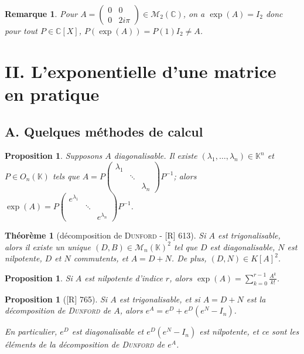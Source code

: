 \documentclass[10pt, a4paper, parskip=full, twoside, twocolumn]{report}
\newtheorem{theorem}[definition]{Théorème}
\newtheorem{proposition}[definition]{Proposition}
\newtheorem{remark}[definition]{Remarque}
\newcommand{\IK}{\mathbb{K}}
\newcommand{\IC}{\mathbb{C}}
\newcommand{\M}{\mathcal{M}}
\begin{document}
\begin{remark}
	Pour $A = \begin{pmatrix}
		0&0\\0& 2i\pi
	\end{pmatrix}\in\M_2(\IC)$, on a $\exp(A) = I_2$ donc pour tout $P\in \IC[X]$, $P(\exp(A)) = P(1)I_2 \neq A$.
\end{remark}

\section*{II. L'exponentielle d'une matrice en pratique}
\subsection*{A. Quelques méthodes de calcul}

\begin{proposition}
	Supposons $A$ diagonalisable. Il existe $(\lambda_1,\dots, \lambda_n)\in\IK^n$ et $P\in O_n(\IK)$ tels que 
	$A = P\begin{pmatrix}
		\lambda_1 & & \\
		& \ddots & \\
		& & \lambda_n
	\end{pmatrix}P^{-1}$; alors $\exp(A) = P\begin{pmatrix}
		e^{\lambda_1} & & \\ & \ddots & \\ & & e^{\lambda_n}
	\end{pmatrix}P^{-1}$.
\end{proposition}

\begin{theorem}[décomposition de \textsc{Dunford} - \textnormal{[R] 613}]
	Si $A$ est trigonalisable, alors il existe un unique $(D,B)\in \M_n(\IK)^2$ tel que $D$ est diagonalisable, $N$ est nilpotente, $D$ et $N$ commutents, et $A = D+N$.
	De plus, $(D,N)\in K[A]^2$.
\end{theorem}

\begin{proposition}
	Si $A$ est nilpotente d'indice $r$, alors $\exp(A) = \sum_{k=0}^{r-1} \frac{A^k}{k!}$.
\end{proposition}

\begin{proposition}[\textnormal{[R] 765}]
	Si $A$ est trigonalisable, et si $A=D+N$ est la décomposition de \textsc{Dunford} de $A$,
	alors $e^A = e^D + e^D(e^N-I_n)$.

	En particulier, $e^D$ est diagonalisable et $e^D(e^N -I_n)$ est nilpotente, et ce sont les éléments de la décomposition de \textsc{Dunford} de $e^A$.
\end{proposition}
\end{document}
